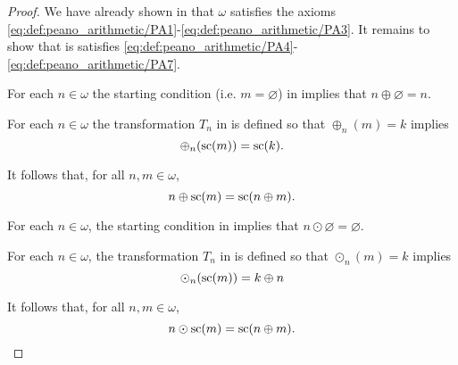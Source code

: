 \begin{proof}
  We have already shown in  that \( \omega \) satisfies the axioms \eqref{eq:def:peano_arithmetic/PA1}-\eqref{eq:def:peano_arithmetic/PA3}. It remains to show that is satisfies \eqref{eq:def:peano_arithmetic/PA4}-\eqref{eq:def:peano_arithmetic/PA7}.

   For each \( n \in \omega \) the starting condition (i.e. \( m = \varnothing \)) in  implies that \( n \oplus \varnothing = n \).

   For each \( n \in \omega \) the transformation \( T_n \) in  is defined so that \( \oplus_n(m) = k \) implies
  \begin{equation*}
    \oplus_n(\op{sc}(m)) = \op{sc}(k).
  \end{equation*}

  It follows that, for all \( n, m \in \omega \),
  \begin{equation*}
    n \oplus \op{sc}(m) = \op{sc}(n \oplus m).
  \end{equation*}

   For each \( n \in \omega \), the starting condition in  implies that \( n \odot \varnothing = \varnothing \).

   For each \( n \in \omega \), the transformation \( T_n \) in  is defined so that \( \odot_n(m) = k \) implies
  \begin{equation*}
    \odot_n(\op{sc}(m)) = k \oplus n
  \end{equation*}

  It follows that, for all \( n, m \in \omega \),
  \begin{equation*}
    n \odot \op{sc}(m) = \op{sc}(n \oplus m).
  \end{equation*}
\end{proof}
